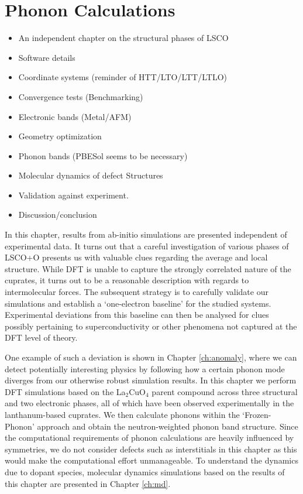 \chapter{Phonon Calculations}\label{ch:simulation}

\begin{framed}
	\begin{itemize}
		\item An independent chapter on the structural phases of LSCO
		\item Software details
		\item Coordinate systems (reminder of HTT/LTO/LTT/LTLO)
		\item Convergence tests (Benchmarking)
		\item Electronic bands (Metal/AFM)
		\item Geometry optimization
		\item Phonon bands (PBESol seems to be necessary)
		\item Molecular dynamics of defect Structures
		\item Validation against experiment.
		\item Discussion/conclusion
	\end{itemize}	
\end{framed}

In this chapter, results from ab-initio simulations are presented independent of experimental data. It turns out that a careful investigation of various phases of LSCO+O presents us with valuable clues regarding the average and local structure. While DFT is unable to capture the strongly correlated nature of the cuprates, it turns out to be a reasonable description with regards to intermolecular forces. The subsequent strategy is to carefully validate our simulations and establish a `one-electron baseline' for the studied systems. Experimental deviations from this baseline can then be analysed for clues possibly pertaining to superconductivity or other phenomena not captured at the DFT level of theory.

One example of such a deviation is shown in Chapter \ref{ch:anomaly}, where we can detect potentially interesting physics by following how a certain phonon mode diverges from our otherwise robust simulation results. In this chapter we perform DFT simulations based on the La$_2$CuO$_4$ parent compound across three structural and two electronic phases, all of which have been observed experimentally in the lanthanum-based cuprates. We then calculate phonons within the `Frozen-Phonon' approach and obtain the neutron-weighted phonon band structure. Since the computational requirements of phonon calculations are heavily influenced by symmetries, we do not consider defects such as interstitials in this chapter as this would make the computational effort unmanageable. To understand the dynamics due to dopant species, molecular dynamics simulations based on the results of this chapter are presented in Chapter \ref{ch:md}.

